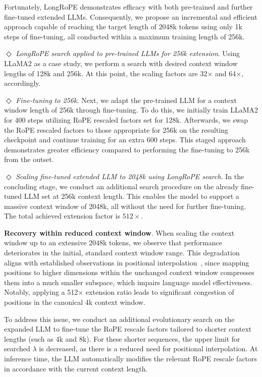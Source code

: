Fortunately, LongRoPE demonstrates efficacy with both pre-trained and further fine-tuned extended LLMs. Consequently, we propose an incremental and efficient approach capable of reaching the target length of 2048k tokens using only 1k steps of fine-tuning, all conducted within a maximum training length of 256k.

$\Diamond$ \textit{LongRoPE search applied to pre-trained LLMs for 256k extension}. Using LLaMA2 as a case study, we perform a search with desired context window lengths of 128k and 256k. At this point, the scaling factors are 32$\times$ and 64$\times$, accordingly.

$\Diamond$ \textit{Fine-tuning to 256k}. Next, we adapt the pre-trained LLM for a context window length of 256k through fine-tuning. To do this, we initially train LLaMA2 for 400 steps utilizing RoPE rescaled factors set for 128k. Afterwards, we swap the RoPE rescaled factors to those appropriate for 256k on the resulting checkpoint and continue training for an extra 600 steps. This staged approach demonstrates greater efficiency compared to performing the fine-tuning to 256k from the outset.

$\Diamond$ \textit{Scaling fine-tuned extended LLM to 2048k using LongRoPE search}. In the concluding stage, we conduct an additional search procedure on the already fine-tuned LLM set at 256k context length. This enables the model to support a massive context window of 2048k, all without the need for further fine-tuning. The total achieved extension factor is $512\times$.

\textbf{Recovery within reduced context window}. When scaling the context window up to an extensive 2048k tokens, we observe that performance deteriorates in the initial, standard context window range. This degradation aligns with established observations in positional interpolation~\cite{pi}, since mapping positions to higher dimensions within the unchanged context window compresses them into a much smaller subspace, which impairs language model effectiveness. Notably, applying a 512$\times$ extension ratio leads to significant congestion of positions in the canonical 4k context window.

To address this issue, we conduct an additional evolutionary search on the expanded LLM to fine-tune the RoPE rescale factors tailored to shorter context lengths (such as 4k and 8k). For these shorter sequences, the upper limit for searched $\lambda$ is decreased, as there is a reduced need for positional interpolation. At inference time, the LLM automatically modifies the relevant RoPE rescale factors in accordance with the current context length.


